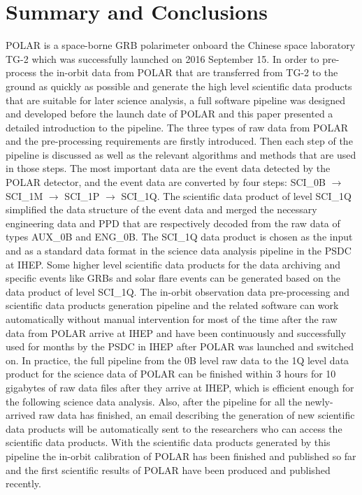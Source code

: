\documentclass{raa}
\begin{document}
\section{Summary and Conclusions}
POLAR is a space-borne GRB polarimeter onboard the Chinese space laboratory TG-2 which was successfully launched on 2016 September 15. In order to pre-process the in-orbit data from POLAR that are transferred from TG-2 to the ground as quickly as possible and generate the high level scientific data products that are suitable for later science analysis, a full software pipeline was designed and developed before the launch date of POLAR and this paper presented a detailed introduction to the pipeline. The three types of raw data from POLAR and the pre-processing requirements are firstly introduced. Then each step of the pipeline is discussed as well as the relevant algorithms and methods that are used in those steps. The most important data are the event data detected by the POLAR detector, and the event data are converted by four steps: SCI\_0B $\rightarrow$ SCI\_1M $\rightarrow$ SCI\_1P $\rightarrow$ SCI\_1Q. The scientific data product of level SCI\_1Q simplified the data structure of the event data and merged the necessary engineering data and PPD that are respectively decoded from the raw data of types AUX\_0B and ENG\_0B. The SCI\_1Q data product is chosen as the input and as a standard data format in the science data analysis pipeline in the PSDC at IHEP. Some higher level scientific data products for the data archiving and specific events like GRBs and solar flare events can be generated based on the data product of level SCI\_1Q. The in-orbit observation data pre-processing and scientific data products generation pipeline and the related software can work automatically without manual intervention for most of the time after the raw data from POLAR arrive at IHEP and have been continuously and successfully used for months by the PSDC in IHEP after POLAR was launched and switched on. In practice, the full pipeline from the 0B level raw data to the 1Q level data product for the science data of POLAR can be finished within 3 hours for 10 gigabytes of raw data files after they arrive at IHEP, which is efficient enough for the following science data analysis. Also, after the pipeline for all the newly-arrived raw data has finished, an email describing the generation of new scientific data products will be automatically sent to the researchers who can access the scientific data products. With the scientific data products generated by this pipeline the in-orbit calibration of POLAR has been finished and published so far and the first scientific results of POLAR have been produced and published recently.
\end{document}
